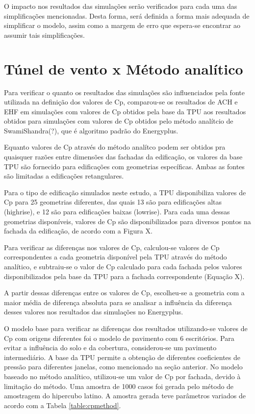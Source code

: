 \documentclass[brazil,hardcopy,openany,a5paper]{ufscthesis}
\begin{document}
	O impacto nos resultados das simulações serão verificados para cada uma das simplificações mencionadas. Desta forma, será definida a forma mais adequada de simplificar o modelo, assim como a margem de erro que espera-se encontrar ao assumir tais simplificações.
	
	\section{Túnel de vento x Método analítico}
	
	Para verificar o quanto os resultados das simulações são influenciados pela fonte utilizada na definição dos valores de Cp, comparou-se os resultados de ACH e EHF em simulações com valores de Cp obtidos pela base da TPU aos resultados obtidos para simulações com valores de Cp obtidos pelo método analítcio de SwamiShandra(?), que é algoritmo padrão do Energyplus.
	
	Equanto valores de Cp através do método analítco podem ser obtidos pra quaisquer razões entre dimensões das fachadas da edificação, os valores da base TPU são fornecido para edificações com geometrias específicas. Ambas as fontes são limitadas a edificações retangulares.
	
	Para o tipo de edificação simulados neste estudo, a TPU disponibiliza valores de Cp para 25 geometrias diferentes, das quais 13 são para edificações altas (highrise), e 12 são para edificações baixas (lowrise). Para cada uma dessas geometrias disponíveis, valores de Cp são disponibilizados para diversos pontos na fachada da edificação, de acordo com a Figura X.
	
	Para verificar as diferenças nos valores de Cp, calculou-se valores de Cp correspondentes a cada geometria disponível pela TPU através do método analítico, e subtraiu-se o valor de Cp calculado para cada fachada pelos valores disponibilizados pela base da TPU para a fachada correspondente (Equação X).
	
	A partir dessas diferenças entre os valores de Cp, escolheu-se a geometria com a maior média de diferença absoluta para se analisar a influência da diferença desses valores nos resultados das simulações no Energyplus.
	
	O modelo base para verificar as diferenças dos resultados utilizando-se valores de Cp com origens diferentes foi o modelo de pavimento com 6 escritórios. Para evitar a influência do solo e da cobertura, considerou-se um pavimento intermediário. A base da TPU permite a obtenção de diferentes coeficientes de pressão para diferentes janelas, como mencionado na seção anterior. No modelo baseado no método analítico, utilizou-se um valor de Cp por fachada, devido à limitação do método. Uma amostra de 1000 casos foi gerada pelo método de amostragem do hipercubo latino. A amostra gerada teve parâmetros variados de acordo com a Tabela \ref{table:cpmethod}.
	
\end{document}
